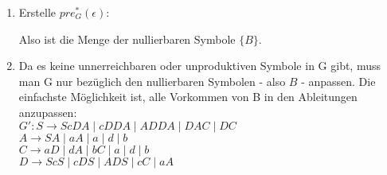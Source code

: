 \documentclass[11pt]{article}
\begin{document}
\begin{enumerate}[label=\alph*)]
\item Erstelle $pre^{*}_{G}(\epsilon)$:
\begin{center}
\end{center}
\begin{center}
\end{center}
Also ist die Menge der nullierbaren Symbole $\{B\}$.
\item Da es keine unnerreichbaren oder unproduktiven Symbole in G gibt, muss man G nur bezüglich den nullierbaren Symbolen - also $B$ - anpassen. Die einfachste Möglichkeit ist, alle Vorkommen von B in den Ableitungen anzupassen:\\
$G': S\rightarrow ScDA \mid cDDA \mid ADDA \mid DAC \mid DC$
\\\hspace*{6mm} $A\rightarrow SA \mid aA \mid a \mid d \mid b$
\\\hspace*{6mm} $C\rightarrow aD \mid dA \mid bC \mid a \mid d \mid b$
\\\hspace*{6mm} $D\rightarrow ScS \mid cDS \mid ADS \mid cC \mid aA$
\end{enumerate}


%
%
\end{document}
